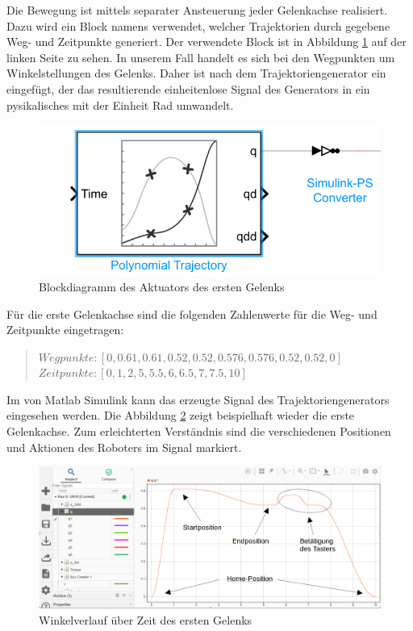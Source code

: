 Die Bewegung ist mittels separater Ansteuerung jeder Gelenkachse realisiert.
Dazu wird ein Block namens  verwendet, welcher Trajektorien durch gegebene Weg- und Zeitpunkte generiert.
Der verwendete Block ist in Abbildung \ref{fig:ur10_trajectoriengenerator} auf der linken Seite zu sehen.
In unserem Fall handelt es sich bei den Wegpunkten um Winkelstellungen des Gelenks.
Daher ist nach dem Trajektoriengenerator ein  eingefügt, der das resultierende einheitenlose Signal des Generators in ein pysikalisches mit der Einheit Rad umwandelt.

\begin{figure}[!htbp]
	\centering
	\includegraphics[width=0.55\linewidth]{grafic/Trajectoriengenerator}
	\caption{Blockdiagramm des Aktuators des ersten Gelenks}
	\label{fig:ur10_trajectoriengenerator}
\end{figure}


Für die erste Gelenkachse sind die folgenden Zahlenwerte für die Weg- und Zeitpunkte eingetragen:

\begin{quote}
$Wegpunkte: [0, 0.61, 0.61, 0.52, 0.52, 0.576, 0.576, 0.52, 0.52, 0] $ \\
$Zeitpunkte: [0, 1, 2, 5, 5.5, 6, 6.5, 7, 7.5, 10]$
\end{quote}

Im  von Matlab Simulink kann das erzeugte Signal des Trajektoriengenerators eingesehen werden.
Die Abbildung \ref{fig:data_inspector_rotation_angle} zeigt beispielhaft wieder die erste Gelenkachse.
Zum erleichterten Verständnis sind die verschiedenen Positionen und Aktionen des Roboters im Signal markiert.

\newpage
\begin{figure}[!htbp]
	\centering
	\includegraphics[width=1.0\linewidth]{grafic/data_inspector_Winkel_erstes_Gelenk}
	\caption{Winkelverlauf über Zeit des ersten Gelenks}
	\label{fig:data_inspector_rotation_angle}
\end{figure}

